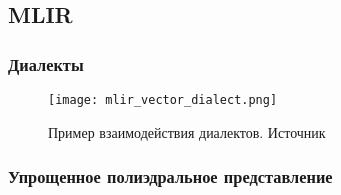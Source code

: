 \subsection{MLIR}
\subsubsection{Диалекты}
\begin{figure}[h]
    \centering
    \texttt{[image: mlir\_vector\_dialect.png]}
    \caption{Пример взаимодействия диалектов. Источник 
    }
    \label{fig:mlir_vector_dialect}
\end{figure}
\subsubsection{Упрощенное полиэдральное представление}
